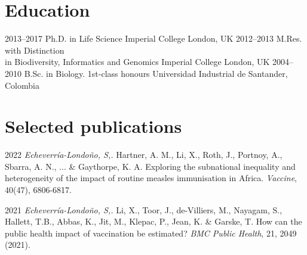 \documentclass[icon]{twentysecondcv}
\begin{document}
\begin{twenty}
    

\end{twenty}


\section{Education}

\begin{twenty}
  \twentyitem
    {2013--2017}
    {Ph.D. {\normalfont in Life Science}}
    {Imperial College London, UK}
    {}
  \twentyitem
    {2012--2013}
    {M.Res. with Distinction \\  {\normalfont in Biodiversity, Informatics and Genomics}}
    {Imperial College London, UK}
    {}
  \twentyitem
    {2004--2010}
    {B.Sc. in Biology. 1st-class honours}
    {Universidad Industrial de Santander, Colombia}
    {}
 \end{twenty}
 
 
 \section{Selected publications}

\small
2022 \textit{Echeverr\'ia-Londo\~no, S,.}  Hartner, A. M., Li, X., Roth, J., Portnoy, A., Sbarra, A. N., ... \& Gaythorpe, K. A. Exploring the subnational inequality and heterogeneity of the impact of routine measles immunisation in Africa. \textit{Vaccine}, 40(47), 6806-6817. 

2021 \textit{Echeverr\'ia-Londo\~no, S,.}  Li, X., Toor, J., de-Villiers, M., Nayagam, S., Hallett, T.B., Abbas, K., Jit, M., Klepac, P., Jean, K. \&  Garske, T. How can the public health impact of vaccination be estimated? \textit{BMC Public Health}, 21, 2049 (2021).
\end{document}
